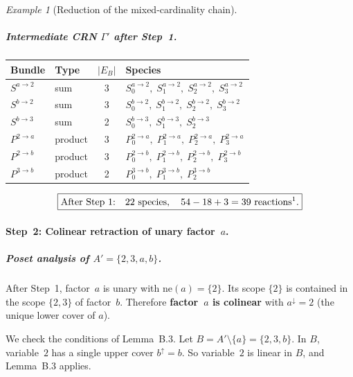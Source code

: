 \documentclass{article}
\theoremstyle{plain}
\theoremstyle{definition}
\theoremstyle{remark}
\newtheorem{example}{Example}[section]
\newcommand{\<}{\langle}
\renewcommand{\>}{\rangle}
\begin{document}
\begin{example}[Reduction of the mixed-cardinality chain]
\subparagraph{Intermediate CRN $\Gamma'$ after Step~1.}
 
\begin{center}
\renewcommand{\arraystretch}{1.15}
\begin{tabular}{@{}llcl@{}}
\toprule
Bundle & Type & $|E_B|$ & Species \\
\midrule
$S^{a\to 2}$ & sum     & 3 & $S^{a\to 2}_0,\; S^{a\to 2}_1,\; S^{a\to 2}_2,\; S^{a\to 2}_3$ \\
$S^{b\to 2}$ & sum     & 3 & $S^{b\to 2}_0,\; S^{b\to 2}_1,\; S^{b\to 2}_2,\; S^{b\to 2}_3$ \\
$S^{b\to 3}$ & sum     & 2 & $S^{b\to 3}_0,\; S^{b\to 3}_1,\; S^{b\to 3}_2$ \\[3pt]
$P^{2\to a}$ & product & 3 & $P^{2\to a}_0,\; P^{2\to a}_1,\; P^{2\to a}_2,\; P^{2\to a}_3$ \\
$P^{2\to b}$ & product & 3 & $P^{2\to b}_0,\; P^{2\to b}_1,\; P^{2\to b}_2,\; P^{2\to b}_3$ \\
$P^{3\to b}$ & product & 2 & $P^{3\to b}_0,\; P^{3\to b}_1,\; P^{3\to b}_2$ \\
\bottomrule
\end{tabular}
\end{center}
 
\[
\boxed{
\text{After Step~1:}\quad
22\text{ species},\quad
54-18+3 = 39 \text{ reactions\footnotemark}.
}
\]
 
 
\paragraph{Step~2: Colinear retraction of unary factor~$a$.}
 
\subparagraph{Poset analysis of $A'=\{2,3,a,b\}$.}
After Step~1, factor~$a$ is unary with $\mathrm{ne}(a)=\{2\}$.
Its scope $\{2\}$ is contained in the scope $\{2,3\}$ of factor~$b$.
Therefore \textbf{factor~$a$ is colinear} with $a^{\downarrow}=2$
(the unique lower cover of $a$).
 
We check the conditions of Lemma~B.3.
Let $B = A'\setminus\{a\} = \{2,3,b\}$.
In $B$, variable~$2$ has a single upper cover $b^{\uparrow}=b$.
So variable~$2$ is linear in $B$, and Lemma~B.3 applies.
 

\end{example}
\end{document}

